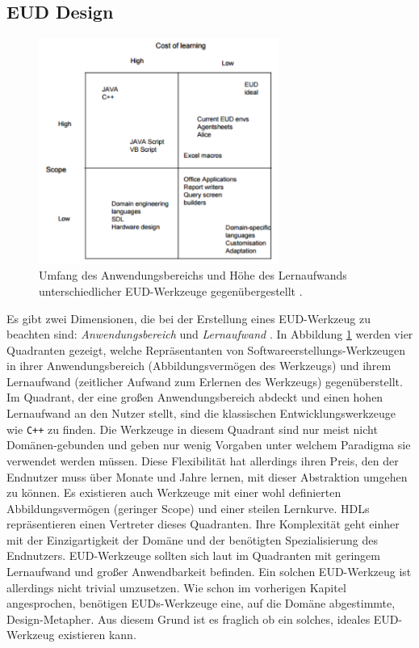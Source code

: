 \subsection{EUD Design}\label{sec:loesungsans}
\begin{figure}[H]
    \centering
    \includegraphics[width=0.7\textwidth]{bilder/chapter2/eudmatrix.png}
    \caption{Umfang des Anwendungsbereichs und Höhe des Lernaufwands unterschiedlicher \ac{EUD}-Werkzeuge gegenübergestellt \cite{fischer2004meta}.}
    \label{fig:kompvslern}
\end{figure}
Es gibt zwei Dimensionen, die bei der Erstellung eines \ac{EUD}-Werkzeug zu beachten sind: \textit{Anwendungsbereich} und \textit{Lernaufwand} \cite{fischer2004meta}. In Abbildung \ref{fig:kompvslern} werden vier Quadranten gezeigt, welche Repräsentanten von Softwareerstellungs-Werkzeugen in ihrer Anwendungsbereich (Abbildungsvermögen des Werkzeugs) und ihrem Lernaufwand (zeitlicher Aufwand zum Erlernen des Werkzeugs) gegenüberstellt. Im Quadrant, der eine großen Anwendungsbereich abdeckt und einen hohen Lernaufwand an den Nutzer stellt, sind die klassischen Entwicklungswerkzeuge wie \texttt{C++} zu finden. Die Werkzeuge in diesem Quadrant sind nur meist nicht Domänen-gebunden und geben nur wenig Vorgaben unter welchem Paradigma sie verwendet werden müssen. Diese Flexibilität hat allerdings ihren Preis, den der Endnutzer muss über Monate und Jahre lernen, mit dieser Abstraktion umgehen zu können. Es existieren auch Werkzeuge mit einer wohl definierten Abbildungsvermögen (geringer Scope) und einer steilen Lernkurve. \acp{HDL} repräsentieren einen Vertreter dieses Quadranten. Ihre Komplexität geht einher mit der Einzigartigkeit der Domäne und der benötigten Spezialisierung des Endnutzers. \ac{EUD}-Werkzeuge sollten sich laut \cite{fischer2004meta} im Quadranten mit geringem Lernaufwand und großer Anwendbarkeit befinden. Ein solchen \ac{EUD}-Werkzeug ist allerdings nicht trivial umzusetzen. Wie schon im vorherigen Kapitel angesprochen, benötigen \acp{EUD}-Werkzeuge eine, auf die Domäne abgestimmte, Design-Metapher. Aus diesem Grund ist es fraglich ob ein solches, ideales \ac{EUD}-Werkzeug existieren kann.

